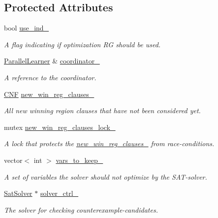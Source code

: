 \subsection*{Protected Attributes}
\begin{DoxyCompactItemize}
\item 
bool \hyperlink{classCounterGenSAT_a4f76493e0c49329ae7f628af99a450f4}{use\-\_\-ind\-\_\-}
\begin{DoxyCompactList}\small\item\em A flag indicating if optimization R\-G should be used. \end{DoxyCompactList}\item 
\hyperlink{classParallelLearner}{Parallel\-Learner} \& \hyperlink{classCounterGenSAT_a90c79c0fa427fcd2dacd760421f5afe4}{coordinator\-\_\-}
\begin{DoxyCompactList}\small\item\em A reference to the coordinator. \end{DoxyCompactList}\item 
\hyperlink{classCNF}{C\-N\-F} \hyperlink{classCounterGenSAT_a5a379bda175a32e3d4ccc0771fde024d}{new\-\_\-win\-\_\-reg\-\_\-clauses\-\_\-}
\begin{DoxyCompactList}\small\item\em All new winning region clauses that have not been considered yet. \end{DoxyCompactList}\item 
mutex \hyperlink{classCounterGenSAT_a120e7ea918e720bedb9b35a40e354307}{new\-\_\-win\-\_\-reg\-\_\-clauses\-\_\-lock\-\_\-}
\begin{DoxyCompactList}\small\item\em A lock that protects the \hyperlink{classCounterGenSAT_a5a379bda175a32e3d4ccc0771fde024d}{new\-\_\-win\-\_\-reg\-\_\-clauses\-\_\-} from race-\/conditions. \end{DoxyCompactList}\item 
vector$<$ int $>$ \hyperlink{classCounterGenSAT_a0c568c2e441491d24a5a98623fa6ce6a}{vars\-\_\-to\-\_\-keep\-\_\-}
\begin{DoxyCompactList}\small\item\em A set of variables the solver should not optimize by the S\-A\-T-\/solver. \end{DoxyCompactList}\item 
\hyperlink{classSatSolver}{Sat\-Solver} $\ast$ \hyperlink{classCounterGenSAT_a8ed22d7411e62b13c50824664e58807a}{solver\-\_\-ctrl\-\_\-}
\begin{DoxyCompactList}\small\item\em The solver for checking counterexample-\/candidates. \end{DoxyCompactList}\item 

\end{DoxyCompactItemize}
